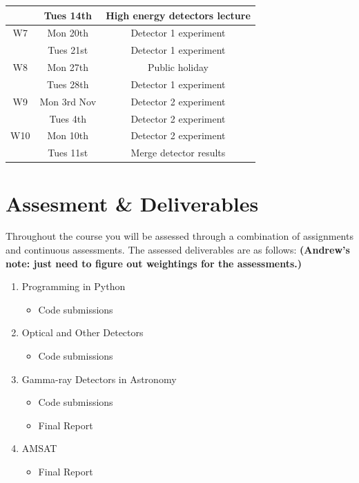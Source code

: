 \documentclass{tufte-book}
\begin{document}
\begin{table}
\begin{tabular}{c|c|c}
           & Tues 14th    & High energy detectors lecture\\
           \hline
        W7 & Mon 20th     & Detector 1 experiment\\
           & Tues 21st    & Detector 1 experiment\\
           \hline
        W8 & Mon 27th     & Public holiday\\
           & Tues 28th    & Detector 1 experiment\\
           \hline
        W9 & Mon 3rd Nov  & Detector 2 experiment\\
           & Tues 4th     & Detector 2 experiment\\
           \hline
        W10 & Mon 10th    & Detector 2 experiment\\
           & Tues 11st    & Merge detector results\\
    \end{tabular}
    \label{tab:my_label}
\end{table}



\newpage

\section{Assesment \& Deliverables}

{Throughout} the course you will be assessed through a combination of assignments and continuous assessments. The assessed deliverables are as follows: \textbf{(Andrew's note: just need to figure out weightings for the assessments.)}

\begin{enumerate}
    \item Programming in Python
    \begin{itemize}
        \item Code submissions
    \end{itemize}
    \item Optical and Other Detectors
    \begin{itemize}
        \item Code submissions
    \end{itemize}
    \item Gamma-ray Detectors in Astronomy
    \begin{itemize}
        \item Code submissions
        \item Final Report
    \end{itemize}
    \item AMSAT
    \begin{itemize}
        \item Final Report
    \end{itemize}
\end{enumerate}
\end{document}

